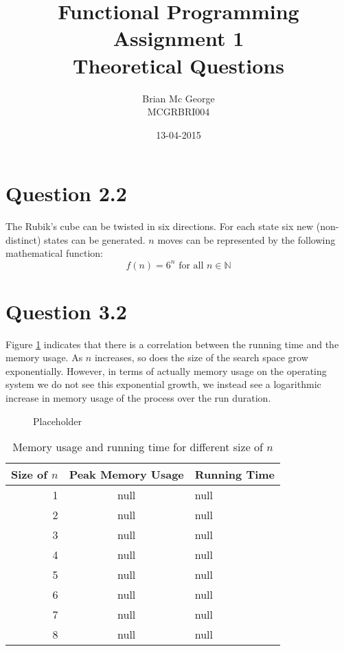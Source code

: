 \documentclass[]{article}
\title{Functional Programming Assignment 1\\Theoretical Questions}
\date{13-04-2015}
\author{Brian Mc George\\MCGRBRI004
}
\begin{document}
\maketitle
\newpage

\section*{Question 2.2}
The Rubik's cube can be twisted in six directions. For each state six new (non-distinct) states can be generated. \(n\) moves can be represented by the following mathematical function:
\begin{equation}\label{func_states}	
	f(n)=6^n\text{ for all }n \in\mathbb{N}
\end{equation}

\section*{Question 3.2}
Figure \ref{fig:memory_usage} indicates that there is a correlation between the running time and the memory usage. As \(n\) increases, so does the size of the search space grow exponentially. However, in terms of actually memory usage on the operating system we do not see this exponential growth, we instead see a logarithmic increase in memory usage of the process over the run duration.
\begin{figure}[tbph]
\centering
\caption{Placeholder}
\label{fig:memory_usage}
\end{figure}
\begin{table}[h]
\begin{center}
	\begin{tabular}{|r|c|l|}
		\hline
		Size of \(n\)&Peak Memory Usage&Running Time\\
		\hline
		1&null&null\\
		2&null&null\\
		3&null&null\\
		4&null&null\\
		5&null&null\\
		6&null&null\\
		7&null&null\\
		8&null&null\\
		\hline
		
	\end{tabular}\caption{Memory usage and running time for different size of \(n\)}\end{center}
	\label{table:mem_usage}
\end{table}
\end{document}
